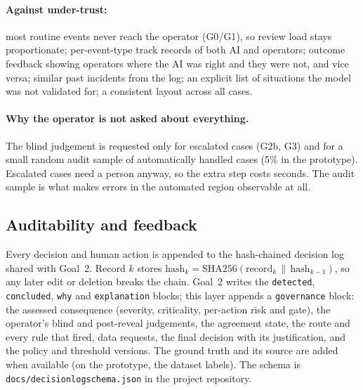 \documentclass[11pt,a4paper]{article}
\renewcommand{\_}{\textunderscore\allowbreak}
\newcommand{\lvl}[1]{\textsf{#1}}
\begin{document}
\paragraph{Against under-trust:} most routine events never reach the operator (\lvl{G0}/\lvl{G1}), so review
load stays proportionate; per-event-type track records of both AI and operators; outcome feedback showing
operators where the AI was right and they were not, and vice versa; similar past incidents from the log; an
explicit list of situations the model was not validated for; a consistent layout across all cases.

\paragraph{Why the operator is not asked about everything.} The blind judgement is requested only for escalated
cases (\lvl{G2b}, \lvl{G3}) and for a small random audit sample of automatically handled cases (5\% in the
prototype). Escalated cases need a person anyway, so the extra step costs seconds. The audit sample is what makes
errors in the automated region observable at all.

\subsection{Auditability and feedback}
Every decision and human action is appended to the hash-chained decision log shared with Goal~2. Record $k$
stores $\mathrm{hash}_k=\mathrm{SHA256}(\mathrm{record}_k\,\|\,\mathrm{hash}_{k-1})$, so any later edit or
deletion breaks the chain. Goal~2 writes the \texttt{detected}, \texttt{concluded}, \texttt{why} and
\texttt{explanation} blocks; this layer appends a \texttt{governance} block: the assessed consequence (severity,
criticality, per-action risk and gate), the operator's blind and post-reveal judgements, the agreement state,
the route and every rule that fired, data requests, the final decision with its justification, and the policy
and threshold versions. The ground truth and its source are added when available (on the prototype, the dataset
labels). The schema is \texttt{docs/decision\_log\_schema.json} in the project repository.
\end{document}
